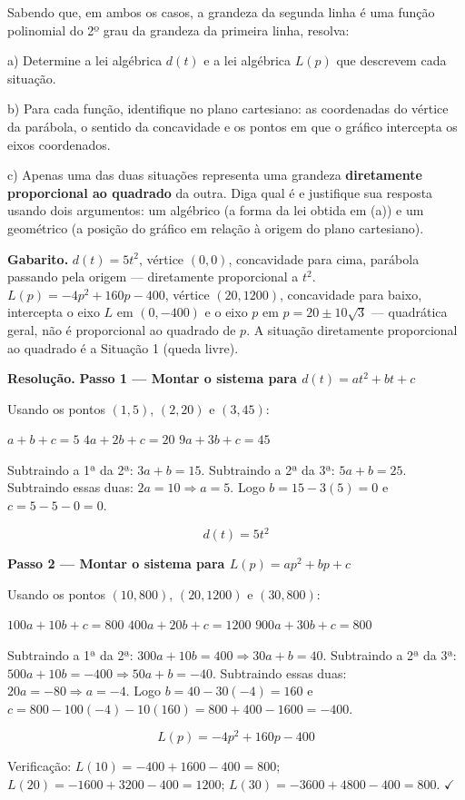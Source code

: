 \documentclass[11pt,a4paper]{article}
\begin{document}
Sabendo que, em ambos os casos, a grandeza da segunda linha é uma função polinomial do 2º grau da grandeza da primeira linha, resolva:

a) Determine a lei algébrica $d(t)$ e a lei algébrica $L(p)$ que descrevem cada situação.

b) Para cada função, identifique no plano cartesiano: as coordenadas do vértice da parábola, o sentido da concavidade e os pontos em que o gráfico intercepta os eixos coordenados.

c) Apenas uma das duas situações representa uma grandeza \textbf{diretamente proporcional ao quadrado} da outra. Diga qual é e justifique sua resposta usando dois argumentos: um algébrico (a forma da lei obtida em (a)) e um geométrico (a posição do gráfico em relação à origem do plano cartesiano).

\textbf{Gabarito.} $d(t)=5t^2$, vértice $(0,0)$, concavidade para cima, parábola passando pela origem — diretamente proporcional a $t^2$. $L(p)=-4p^2+160p-400$, vértice $(20,1200)$, concavidade para baixo, intercepta o eixo $L$ em $(0,-400)$ e o eixo $p$ em $p=20\pm10\sqrt3$ — quadrática geral, não é proporcional ao quadrado de $p$. A situação diretamente proporcional ao quadrado é a Situação 1 (queda livre).

\textbf{Resolução.} \textbf{Passo 1 — Montar o sistema para $d(t) = at^2+bt+c$}

Usando os pontos $(1,5)$, $(2,20)$ e $(3,45)$:

$a+b+c=5$
$4a+2b+c=20$
$9a+3b+c=45$

Subtraindo a 1ª da 2ª: $3a+b=15$. Subtraindo a 2ª da 3ª: $5a+b=25$. Subtraindo essas duas: $2a=10 \Rightarrow a=5$. Logo $b=15-3(5)=0$ e $c=5-5-0=0$.

$$d(t)=5t^2$$

\textbf{Passo 2 — Montar o sistema para $L(p) = ap^2+bp+c$}

Usando os pontos $(10,800)$, $(20,1200)$ e $(30,800)$:

$100a+10b+c=800$
$400a+20b+c=1200$
$900a+30b+c=800$

Subtraindo a 1ª da 2ª: $300a+10b=400 \Rightarrow 30a+b=40$.
Subtraindo a 2ª da 3ª: $500a+10b=-400 \Rightarrow 50a+b=-40$.
Subtraindo essas duas: $20a=-80 \Rightarrow a=-4$. Logo $b=40-30(-4)=160$ e $c=800-100(-4)-10(160)=800+400-1600=-400$.

$$L(p)=-4p^2+160p-400$$

Verificação: $L(10)=-400+1600-400=800$; $L(20)=-1600+3200-400=1200$; $L(30)=-3600+4800-400=800$. $\checkmark$
\end{document}
